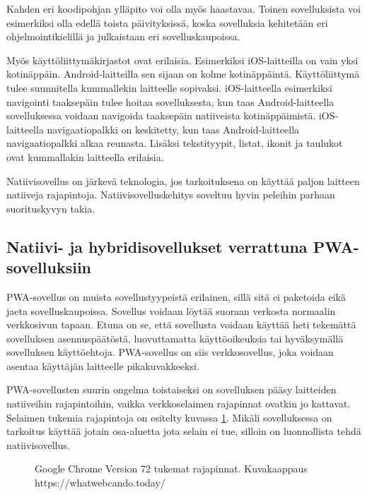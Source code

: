 \documentclass{tktltiki}
\begin{document}
Kahden eri koodipohjan ylläpito voi olla myös haastavaa. Toinen sovelluksista voi esimerkiksi olla edellä toista päivityksissä, koska sovelluksia kehitetään eri ohjelmointikielillä ja julkaistaan eri sovelluskaupoissa.

Myös käyttöliittymäkirjastot ovat erilaisia. Esimerkiksi iOS-laitteilla on vain yksi kotinäppäin. Android-laitteilla sen sijaan on kolme kotinäppäintä. \cite{Sojka} Käyttöliittymä tulee suunnitella kummallekin laitteelle sopivaksi. iOS-laitteella esimerkiksi navigointi taaksepäin tulee hoitaa sovelluksesta, kun taas Android-laitteella sovelluksessa voidaan navigoida taaksepäin natiiveista kotinäppäimistä. iOS-laitteella navigaatiopalkki on keskitetty, kun taas Android-laitteella navigaatiopalkki alkaa reunasta. Lisäksi tekstityypit, listat, ikonit ja taulukot ovat kummallakin laitteella erilaisia.

Natiivisovellus on järkevä teknologia, jos tarkoituksena on käyttää paljon laitteen natiiveja rajapintoja. Natiivisovelluskehitys soveltuu hyvin peleihin parhaan suorituskyvyn takia. 

\subsection{Natiivi- ja hybridisovellukset verrattuna PWA-sovelluksiin}

PWA-sovellus on muista sovellustyypeistä erilainen, sillä sitä ei paketoida eikä jaeta sovelluskaupoissa. Sovellus voidaan löytää suoraan verkosta normaalin verkkosivun tapaan. Etuna on se, että sovellusta voidaan käyttää heti tekemättä sovelluksen asennuspäätöstä, luovuttamatta käyttöoikeuksia tai hyväksymällä sovelluksen käyttöehtoja. PWA-sovellus on siis verkkosovellus, joka voidaan asentaa käyttäjän laitteelle pikakuvakkeeksi. 

PWA-sovellusten suurin ongelma toistaiseksi on sovelluksen pääsy laitteiden natiiveihin rajapintoihin, vaikka verkkoselaimen rajapinnat ovatkin jo kattavat. Selaimen tukemia rajapintoja on esitelty kuvassa \ref{Selaimen rajapinnat}. Mikäli sovelluksessa on tarkoitus käyttää jotain osa-aluetta jota selain ei tue, silloin on luonnollista tehdä natiivisovellus.

\begin{figure}[h]
\begin{center}
\caption{Google Chrome Version 72 tukemat rajapinnat. Kuvakaappaus https://whatwebcando.today/ }
\label{Selaimen rajapinnat}
\end{center}
\end{figure}
\clearpage
\end{document}
